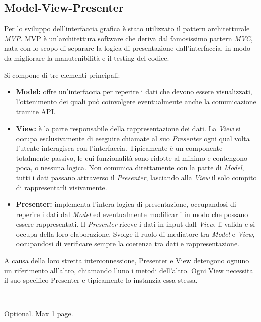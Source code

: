 \documentclass[12pt,a4paper,openright,twoside]{book}
\newcommand{\itemdef}[1]{\item \textbf{#1}}
\begin{document}
\subsection{Model-View-Presenter}

Per lo sviluppo dell'interfaccia grafica è stato utilizzato il pattern architetturale \textit{\gls{MVP}}.
\gls{MVP} è un'architettura software che deriva dal famosissimo pattern \textit{\gls{MVC}}, nata con lo scopo di separare la logica di presentazione dall'interfaccia, in modo da migliorare la manutenibilità e il testing del codice.

Si compone di tre elementi principali:

\begin{itemize}
	\itemdef{Model:}
	offre un'interfaccia per reperire i dati che devono essere visualizzati, l'ottenimento dei quali può coinvolgere eventualmente anche la comunicazione tramite API.
	
	\itemdef{View:}
	è la parte responsabile della rappresentazione dei dati.
	La \textit{View} si occupa esclusivamente di eseguire chiamate al suo \textit{Presenter} ogni qual volta l'utente interagisca con l'interfaccia.
	Tipicamente è un componente totalmente passivo, le cui funzionalità sono ridotte al minimo e contengono poca, o nessuna logica.
	Non comunica direttamente con la parte di \textit{Model}, tutti i dati passano attraverso il \textit{Presenter}, lasciando alla \textit{View} il solo compito di rappresentarli visivamente.
	
	\itemdef{Presenter:}
	implementa l'intera logica di presentazione, occupandosi di reperire i dati dal \textit{Model} ed eventualmente modificarli in modo che possano essere rappresentati.
	Il \textit{Presenter} riceve i dati in input dall \textit{View}, li valida e si occupa della loro elaborazione.
	Svolge il ruolo di mediatore tra \textit{Model} e \textit{View}, occupandosi di verificare sempre la coerenza tra dati e rappresentazione.
\end{itemize}
A causa della loro stretta interconnessione, Presenter e View detengono ognuno un riferimento all'altro, chiamando l'uno i metodi dell'altro.
Ogni View necessita il suo specifico Presenter e tipicamente lo instanzia essa stessa.




\backmatter\




\begin{acknowledgements} %
Optional. Max 1 page.
\end{acknowledgements}
\end{document}
